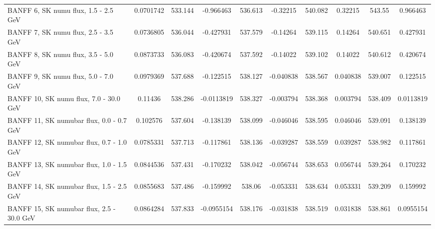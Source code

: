 \documentclass{standalone}
\begin{document}
\begin{tabular}{| l | S | S  S | S  S | S  S | S  S | }
                                           BANFF  6, SK numu flux, 1.5 - 2.5 GeV &       0.0701742 &         533.144 &       -0.966463 &         536.613 &        -0.32215 &         540.082 &         0.32215 &          543.55 &        0.966463 \\ 
                                           BANFF  7, SK numu flux, 2.5 - 3.5 GeV &       0.0736805 &         536.044 &       -0.427931 &         537.579 &        -0.14264 &         539.115 &         0.14264 &         540.651 &        0.427931 \\ 
                                           BANFF  8, SK numu flux, 3.5 - 5.0 GeV &       0.0873733 &         536.083 &       -0.420674 &         537.592 &        -0.14022 &         539.102 &         0.14022 &         540.612 &        0.420674 \\ 
                                           BANFF  9, SK numu flux, 5.0 - 7.0 GeV &       0.0979369 &         537.688 &       -0.122515 &         538.127 &       -0.040838 &         538.567 &        0.040838 &         539.007 &        0.122515 \\ 
                                          BANFF 10, SK numu flux, 7.0 - 30.0 GeV &         0.11436 &         538.286 &      -0.0113819 &         538.327 &       -0.003794 &         538.368 &        0.003794 &         538.409 &       0.0113819 \\ 
                                        BANFF 11, SK numubar flux, 0.0 - 0.7 GeV &        0.102576 &         537.604 &       -0.138139 &         538.099 &       -0.046046 &         538.595 &        0.046046 &         539.091 &        0.138139 \\ 
                                        BANFF 12, SK numubar flux, 0.7 - 1.0 GeV &       0.0785331 &         537.713 &       -0.117861 &         538.136 &       -0.039287 &         538.559 &        0.039287 &         538.982 &        0.117861 \\ 
                                        BANFF 13, SK numubar flux, 1.0 - 1.5 GeV &       0.0844536 &         537.431 &       -0.170232 &         538.042 &       -0.056744 &         538.653 &        0.056744 &         539.264 &        0.170232 \\ 
                                        BANFF 14, SK numubar flux, 1.5 - 2.5 GeV &       0.0855683 &         537.486 &       -0.159992 &          538.06 &       -0.053331 &         538.634 &        0.053331 &         539.209 &        0.159992 \\ 
                                       BANFF 15, SK numubar flux, 2.5 - 30.0 GeV &       0.0864284 &         537.833 &      -0.0955154 &         538.176 &       -0.031838 &         538.519 &        0.031838 &         538.861 &       0.0955154 \\ 

\end{tabular}
\end{document}
